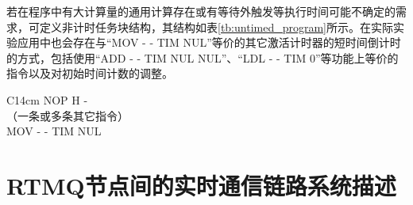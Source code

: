
若在程序中有大计算量的通用计算存在或有等待外触发等执行时间可能不确定的需求，可定义非计时任务块结构，其结构如表\ref{tb:untimed_program}所示。在实际实验应用中也会存在与“MOV - - TIM NUL”等价的其它激活计时器的短时间倒计时的方式，包括使用“ADD - - TIM NUL NUL”、“LDL - - TIM 0”等功能上等价的指令以及对初始时间计数的调整。

\begin{table}
    \centering
    \caption[非计时任务块结构]{非计时任务块结构\label{tb:untimed_program}}
    \begin{tabular}{C{14cm}}
        \toprule
        NOP H -\\
        （一条或多条其它指令）\\
        MOV - - TIM NUL \\
        \bottomrule
    \end{tabular}
\end{table}










\newpage
\section[RTMQ节点间的实时通信链路系统描述]{RTMQ节点间的实时通信链路系统描述\label{section:rtmq_links}}

